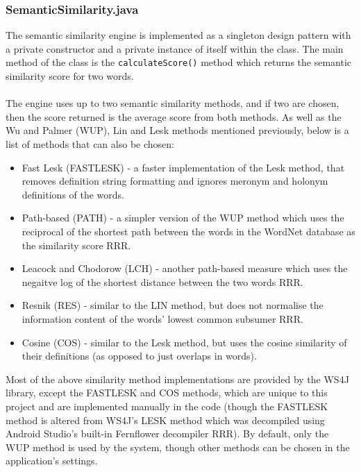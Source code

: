 \documentclass[11pt]{article}
\begin{document}
\subsubsection{SemanticSimilarity.java}
\label{section:semantic-impl}

The semantic similarity engine is implemented as a singleton design pattern with a private constructor and a private instance of itself within the class. The main method of the class is the \texttt{calculateScore()} method which returns the semantic similarity score for two words.
\\
\\
The engine uses up to two semantic similarity methods, and if two are chosen, then the score returned is the average score from both methods. As well as the Wu and Palmer (WUP), Lin and Lesk methods mentioned previously, below is a list of methods that can also be chosen: 

\begin{itemize}
\item Fast Lesk (FASTLESK) - a faster implementation of the Lesk method, that removes definition string formatting and ignores meronym and holonym definitions of the words.

\item Path-based (PATH) - a simpler version of the WUP method which uses the reciprocal of the shortest path between the words in the WordNet database as the similarity score RRR.

\item Leacock and Chodorow (LCH) - another path-based measure which uses the negaitve log of the shortest distance between the two words RRR.

\item Resnik (RES) - similar to the LIN method, but does not normalise the information content of the words' lowest common subsumer RRR.

\item Cosine (COS) - similar to the Lesk method, but uses the cosine similarity of their definitions (as opposed to just overlaps in words).
\end{itemize}

Most of the above similarity method implementations are provided by the WS4J library, except the FASTLESK and COS methods, which are unique to this project and are implemented manually in the code (though the FASTLESK method is altered from WS4J's LESK method which was decompiled using Android Studio's built-in Fernflower decompiler RRR). By default, only the WUP method is used by the system, though other methods can be chosen in the application's settings.
\end{document}
